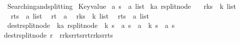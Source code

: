 %
\begin{isabellebody}%
%
%
\isadelimtheory
%
\endisadelimtheory
%
\isatagtheory
{}\isamarkupfalse%
\ Searching{\isacharunderscore}and{\isacharunderscore}splitting\isanewline
{}\ Key{\isacharunderscore}value\isanewline
{}%
\endisatagtheory
{\isafoldtheory}%
%
\isadelimtheory
\isanewline
%
\endisadelimtheory
\isanewline
\isanewline
\isanewline
\isanewline
\isanewline
{}\isamarkupfalse%
\ {\isacharprime}a\ s\ {\isacharequal}\ {\isachardoublequoteopen}{\isacharprime}a\ list{\isachardoublequoteclose}\isanewline
\isanewline
{}\isamarkupfalse%
\ {\isacharparenleft}{\isacharprime}k{\isacharcomma}{\isacharprime}a{\isacharparenright}\ rsplit{\isacharunderscore}node\ {\isacharequal}\isanewline
\ \ r{\isacharunderscore}ks{}\ {\isacharcolon}{\isacharcolon}\ {\isachardoublequoteopen}{\isacharprime}k\ list{\isachardoublequoteclose}\isanewline
\ \ r{\isacharunderscore}ts{}\ {\isacharcolon}{\isacharcolon}\ {\isachardoublequoteopen}{\isacharprime}a\ list{\isachardoublequoteclose}\isanewline
\ \ r{\isacharunderscore}t\ {\isacharcolon}{\isacharcolon}\ {\isacharprime}a\isanewline
\ \ r{\isacharunderscore}ks{}\ {\isacharcolon}{\isacharcolon}\ {\isachardoublequoteopen}{\isacharprime}k\ list{\isachardoublequoteclose}\isanewline
\ \ r{\isacharunderscore}ts{}\ {\isacharcolon}{\isacharcolon}\ {\isachardoublequoteopen}{\isacharprime}a\ list{\isachardoublequoteclose}\isanewline
\isanewline
\isanewline
{}\isamarkupfalse%
\ dest{\isacharunderscore}rsplit{\isacharunderscore}node\ {\isacharcolon}{\isacharcolon}\ {\isachardoublequoteopen}{\isacharparenleft}{\isacharprime}k{\isacharcomma}{\isacharprime}a{\isacharparenright}\ rsplit{\isacharunderscore}node\ {\isasymRightarrow}\ {\isacharprime}k\ s\ {\isacharasterisk}\ {\isacharprime}a\ s\ {\isacharasterisk}\ {\isacharprime}a\ {\isacharasterisk}\ {\isacharprime}k\ s\ {\isacharasterisk}\ {\isacharprime}a\ s{\isachardoublequoteclose}\ \isanewline
{\isachardoublequoteopen}dest{\isacharunderscore}rsplit{\isacharunderscore}node\ r\ {\isacharequal}\ {\isacharparenleft}r{\isacharbar}{\isachargreater}r{\isacharunderscore}ks{}{\isacharcomma}r{\isacharbar}{\isachargreater}r{\isacharunderscore}ts{}{\isacharcomma}r{\isacharbar}{\isachargreater}r{\isacharunderscore}t{\isacharcomma}r{\isacharbar}{\isachargreater}r{\isacharunderscore}ks{}{\isacharcomma}r{\isacharbar}{\isachargreater}r{\isacharunderscore}ts{}{\isacharparenright}{\isachardoublequoteclose}\isanewline

\end{isabellebody}
